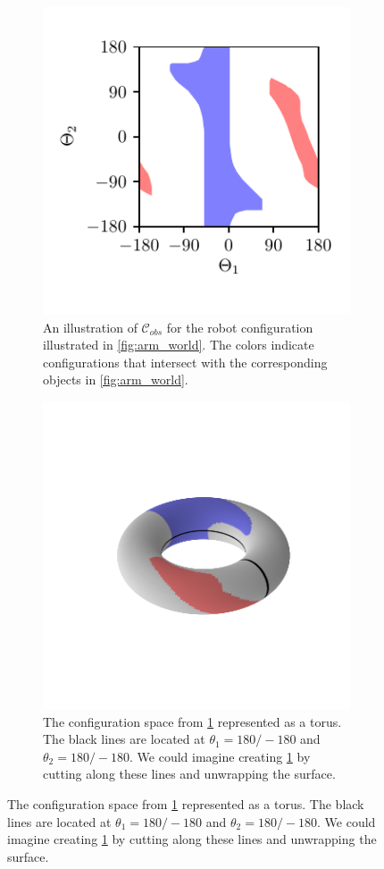 \begin{figure}
\begin{center}
    
    \begin{subfigure}[]{0.45\textwidth}
      \begin{center}  
        \includegraphics[]{planning/figs/arm_cspace/arm_c_space.pdf}
      \end{center}  
      \caption{An illustration of $\mathcal{C}_{obs}$ for the robot
        configuration illustrated in \ref{fig:arm_world}. The colors
        indicate configurations that intersect with the corresponding
        objects in  \ref{fig:arm_world}. }
      \label{fig:arm_c_space}
    \end{subfigure}\hspace{1em}
    \begin{subfigure}[]{0.45\textwidth}
      \begin{center}  
        \includegraphics[]{planning/figs/arm_cspace/arm_torus.pdf}
      \end{center}  
      \caption{The configuration space from \ref{fig:arm_c_space}
        represented as a torus.  The black lines are located at
        $\theta_1 = 180/-180$ and $\theta_2 = 180/-180$.  We could
        imagine creating \ref{fig:arm_c_space} by cutting along these
        lines and unwrapping the surface. }
    \end{subfigure}
    

\end{center}
\end{figure}
